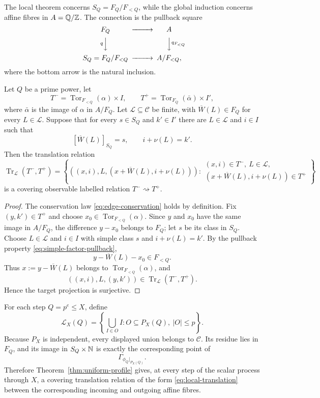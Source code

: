 The local theorem concerns $S_Q=F_Q/F_{<Q}$, while the global induction concerns affine fibres in $A=\mathbb Q/\mathbb Z$.  The connection is the pullback square
\begin{equation}\label{eq:simple-factor-pullback}
\begin{CD}
F_Q @>>> A\\
@V{q}VV @VV{q_{F_{<Q}}}V\\
S_Q=F_Q/F_{<Q} @>>> A/F_{<Q},
\end{CD}
\end{equation}
where the bottom arrow is the natural inclusion.

\begin{lemma}\label{lem:affine-current-lift}
Let $Q$ be a prime power, let
\[
T^-=\operatorname{Tor}_{F_{<Q}}(\alpha)\times I,
\qquad
T^+=\operatorname{Tor}_{F_Q}(\bar\alpha)\times I',
\]
where $\bar\alpha$ is the image of $\alpha$ in $A/F_Q$.  Let $\mathscr L\subseteq\mathcal C$ be finite, with $\overline W(L)\in F_Q$ for every $L\in\mathscr L$.  Suppose that for every $s\in S_Q$ and $k'\in I'$ there are $L\in\mathscr L$ and $i\in I$ such that
\[
[\overline W(L)]_{S_Q}=s,
\qquad
i+\nu(L)=k'.
\]
Then the translation relation
\begin{equation}\label{eq:local-translation}
\operatorname{Tr}_{\mathscr L}(T^-,T^+)
=
\left\{
((x,i),L,(x+\overline W(L),i+\nu(L))):
\substack{(x,i)\in T^-,\ L\in\mathscr L,\\
(x+\overline W(L),i+\nu(L))\in T^+}
\right\}
\end{equation}
is a covering observable labelled relation $T^-\rightsquigarrow T^+$.
\end{lemma}

\begin{proof}
The conservation law \eqref{eq:edge-conservation} holds by definition.  Fix $(y,k')\in T^+$ and choose $x_0\in\operatorname{Tor}_{F_{<Q}}(\alpha)$.  Since $y$ and $x_0$ have the same image in $A/F_Q$, the difference $y-x_0$ belongs to $F_Q$; let $s$ be its class in $S_Q$.  Choose $L\in\mathscr L$ and $i\in I$ with simple class $s$ and $i+\nu(L)=k'$.  By the pullback property \eqref{eq:simple-factor-pullback},
\[
y-\overline W(L)-x_0\in F_{<Q}.
\]
Thus $x:=y-\overline W(L)$ belongs to $\operatorname{Tor}_{F_{<Q}}(\alpha)$, and
\[
((x,i),L,(y,k'))
\in\operatorname{Tr}_{\mathscr L}(T^-,T^+).
\]
Hence the target projection is surjective.
\end{proof}

For each step $Q=p^e\le X$, define
\begin{equation}\label{eq:physical-local-labels}
\mathscr L_X(Q)
=
\left\{
\bigcup_{I\in O}I:
O\subseteq P_X(Q),\ |O|\le p
\right\}.
\end{equation}
Because $P_X$ is independent, every displayed union belongs to $\mathcal C$.  Its residue lies in $F_Q$, and its image in $S_Q\times\mathbb N$ is exactly the corresponding point of
\[
\Gamma_{\phi_Q|_{P_X(Q)}}.
\]
Therefore Theorem~\ref{thm:uniform-profile} gives, at every step of the scalar process through $X$, a covering translation relation of the form \eqref{eq:local-translation} between the corresponding incoming and outgoing affine fibres.

